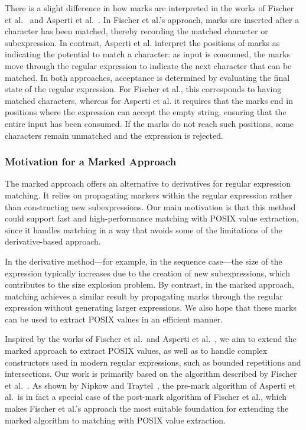 \documentclass[12pt]{article}
\begin{document}
There is a slight difference in how marks are interpreted in the works of Fischer et al.~\cite{Fischer2010}  
and Asperti et al.~\cite{Asperti2010}.  
In Fischer et al.’s approach, marks are inserted after a character has been matched, thereby recording the matched character or subexpression.  
In contrast, Asperti et al. interpret the positions of marks as indicating the potential to match a character:  
as input is consumed, the marks move through the regular expression to indicate the next character that can be matched.  
In both approaches, acceptance is determined by evaluating the final state of the regular expression.  
For Fischer et al., this corresponds to having matched characters, whereas for Asperti et al. it requires that the marks end in positions  
where the expression can accept the empty string, ensuring that the entire input has been consumed.  
If the marks do not reach such positions, some characters remain unmatched and the expression is rejected.

\subsubsection{Motivation for a Marked Approach}

The marked approach offers an alternative to derivatives for regular expression matching.  
It relies on propagating markers within the regular expression rather than constructing new subexpressions.  
Our main motivation is that this method could support fast and high-performance matching with POSIX value extraction,  
since it handles matching in a way that avoids some of the limitations of the derivative-based approach.  

In the derivative method—for example, in the sequence case—the size of the expression typically increases  
due to the creation of new subexpressions, which contributes to the size explosion problem.  
By contrast, in the marked approach, matching achieves a similar result by propagating marks through the regular expression  
without generating larger expressions.  
We also hope that these marks can be used to extract POSIX values in an efficient manner.  

Inspired by the works of Fischer et al.\ and Asperti et al.~\cite{Fischer2010, Asperti2010},  
we aim to extend the marked approach to extract POSIX values, as well as to handle complex constructors used in modern regular expressions,  
such as bounded repetitions and intersections.  
Our work is primarily based on the algorithm described by Fischer et al.~\cite{Fischer2010}.  
As shown by Nipkow and Traytel~\cite{NipkowTraytel2014}, the pre-mark algorithm of Asperti et al.\ is in fact a special case of the  
post-mark algorithm of Fischer et al., which makes Fischer et al.’s approach the most suitable foundation for extending the marked  
algorithm to matching with POSIX value extraction.
\end{document}
